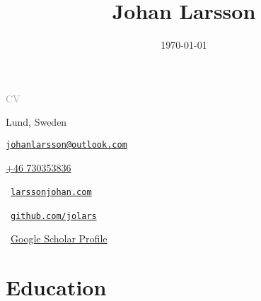 \documentclass[english,a4paper]{article}
\date{\today}
\title{Johan Larsson}
\renewcommand*{%
  \mkbibnamegiven
}[1]{\ifitemannotation{highlight}{\textbf{#1}}{#1}}
\renewcommand*{%
  \mkbibnamefamily
}[1]{\ifitemannotation{highlight}{\textbf{#1}}{#1}}
\begin{document}
\begin{titlepage}
\end{titlepage}

{\large\textcolor{darkgray}{CV}} \smallskip

\smallskip

\noindent {\large \today}

\baselineskip

\begin{minipage}[t]{0.5\textwidth}
  \small\noindent%
  Lund, Sweden

  \href{mailto:johanlarsson@outlook.com}{\nolinkurl{johanlarsson@outlook.com}}

  \href{tel:+46730353836}{+46 730353836}
\end{minipage}%
\begin{minipage}[t]{0.5\textwidth}
  \raggedleft\small
  {\faHome}\, \href{https://larssonjohan.com}{\nolinkurl{larssonjohan.com}}


  {\faGithub}\, \href{https://github.com/jolars}{\nolinkurl{github.com/jolars}}



  {\aiGoogleScholar}\,
  \href{https://scholar.google.com/citations?user=DCJvywYAAAAJ}{Google Scholar Profile}
\end{minipage}


\section{Education}
\end{document}
